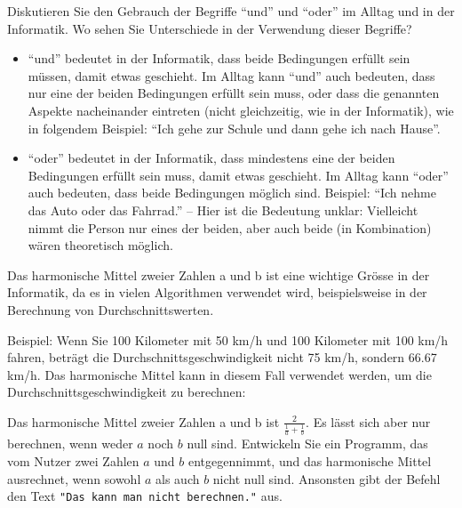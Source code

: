 \begin{mychallenge}
	Diskutieren Sie den Gebrauch der Begriffe \enquote{und} und \enquote{oder} im Alltag und in der Informatik. Wo sehen Sie Unterschiede in der Verwendung dieser Begriffe?
	\begin{myanswer}
		\begin{itemize}
			\item \enquote{und} bedeutet in der Informatik, dass beide Bedingungen erfüllt sein müssen, damit etwas geschieht. Im Alltag kann \enquote{und} auch bedeuten, dass nur eine der beiden Bedingungen erfüllt sein muss, oder dass die genannten Aspekte nacheinander eintreten (nicht gleichzeitig, wie in der Informatik), wie in folgendem Beispiel: \enquote{Ich gehe zur Schule und dann gehe ich nach Hause}.
			\item \enquote{oder} bedeutet in der Informatik, dass mindestens eine der beiden Bedingungen erfüllt sein muss, damit etwas geschieht. Im Alltag kann \enquote{oder} auch bedeuten, dass beide Bedingungen möglich sind. Beispiel: \enquote{Ich nehme das Auto oder das Fahrrad.} -- Hier ist die Bedeutung unklar: Vielleicht nimmt die Person nur eines der beiden, aber auch beide (in Kombination) wären theoretisch möglich.
		\end{itemize}
	\end{myanswer}
\end{mychallenge}

\begin{mychallenge}
	Das harmonische Mittel zweier Zahlen a und b ist eine wichtige Grösse in der Informatik, da es in vielen Algorithmen verwendet wird, beispielsweise in der Berechnung von Durchschnittswerten.

	Beispiel: Wenn Sie 100 Kilometer mit 50 km/h und 100 Kilometer mit 100 km/h fahren, beträgt die Durchschnittsgeschwindigkeit nicht 75 km/h, sondern 66.67 km/h. Das harmonische Mittel kann in diesem Fall verwendet werden, um die Durchschnittsgeschwindigkeit zu berechnen:

	Das harmonische Mittel zweier Zahlen a und b ist $\frac{2}{\frac{1}{a}+\frac{1}{b}}$. Es lässt sich aber nur berechnen, wenn weder $a$ noch $b$ null sind. Entwickeln Sie ein Programm, das vom Nutzer zwei Zahlen $a$ und $b$ entgegennimmt, und das harmonische Mittel ausrechnet, wenn sowohl $a$ als auch $b$ nicht null sind. Ansonsten gibt der Befehl den Text \lstinline|"Das kann man nicht berechnen."| aus.

	\begin{myanswer}
		
	\end{myanswer}
\end{mychallenge}


